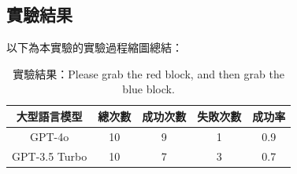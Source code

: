 \documentclass[class=NCU_thesis, crop=false]{standalone}
\begin{document}
\subsection{實驗結果}
以下為本實驗的實驗過程縮圖總結：\\


\begin{table}[h]
    \centering
    \caption{實驗結果：Please grab the red block, and then grab the blue block.}
    \begin{tabular}{ccccc}
    \hline
    大型語言模型 & 總次數 & 成功次數 & 失敗次數 & 成功率 \\
    \hline
    GPT-4o & 10 & 9 & 1 & 0.9\\
    \hline
    GPT-3.5 Turbo & 10 & 7 & 3 & 0.7\\
    \hline
    \end{tabular}
\end{table}
\end{document}
